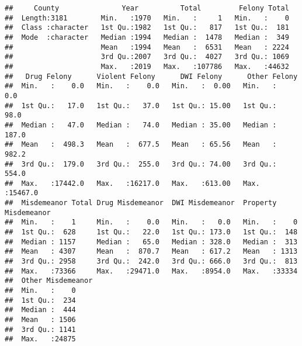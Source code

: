 \documentclass[
]{article}
\newenvironment{Shaded}{\begin{snugshade}}{\end{snugshade}}
\newcommand{\FunctionTok}[1]{\textcolor[rgb]{0.13,0.29,0.53}{\textbf{#1}}}
\newcommand{\NormalTok}[1]{#1}
\newcommand{\OtherTok}[1]{\textcolor[rgb]{0.56,0.35,0.01}{#1}}
\newcommand{\SpecialCharTok}[1]{\textcolor[rgb]{0.81,0.36,0.00}{\textbf{#1}}}
\newcommand{\StringTok}[1]{\textcolor[rgb]{0.31,0.60,0.02}{#1}}
\begin{document}
\begin{verbatim}
##     County               Year          Total         Felony Total  
##  Length:3181        Min.   :1970   Min.   :     1   Min.   :    0  
##  Class :character   1st Qu.:1982   1st Qu.:   817   1st Qu.:  181  
##  Mode  :character   Median :1994   Median :  1478   Median :  349  
##                     Mean   :1994   Mean   :  6531   Mean   : 2224  
##                     3rd Qu.:2007   3rd Qu.:  4027   3rd Qu.: 1069  
##                     Max.   :2019   Max.   :107786   Max.   :44632  
##   Drug Felony      Violent Felony      DWI Felony      Other Felony    
##  Min.   :    0.0   Min.   :    0.0   Min.   :  0.00   Min.   :    0.0  
##  1st Qu.:   17.0   1st Qu.:   37.0   1st Qu.: 15.00   1st Qu.:   98.0  
##  Median :   47.0   Median :   74.0   Median : 35.00   Median :  187.0  
##  Mean   :  498.3   Mean   :  677.5   Mean   : 65.56   Mean   :  982.2  
##  3rd Qu.:  179.0   3rd Qu.:  255.0   3rd Qu.: 74.00   3rd Qu.:  554.0  
##  Max.   :17442.0   Max.   :16217.0   Max.   :613.00   Max.   :15467.0  
##  Misdemeanor Total Drug Misdemeanor  DWI Misdemeanor  Property Misdemeanor
##  Min.   :    1     Min.   :    0.0   Min.   :   0.0   Min.   :    0       
##  1st Qu.:  628     1st Qu.:   22.0   1st Qu.: 173.0   1st Qu.:  148       
##  Median : 1157     Median :   65.0   Median : 328.0   Median :  313       
##  Mean   : 4307     Mean   :  870.7   Mean   : 617.2   Mean   : 1313       
##  3rd Qu.: 2958     3rd Qu.:  242.0   3rd Qu.: 666.0   3rd Qu.:  813       
##  Max.   :73366     Max.   :29471.0   Max.   :8954.0   Max.   :33334       
##  Other Misdemeanor
##  Min.   :    0    
##  1st Qu.:  234    
##  Median :  444    
##  Mean   : 1506    
##  3rd Qu.: 1141    
##  Max.   :24875
\end{verbatim}

\begin{Shaded}
\end{Shaded}
\end{document}
